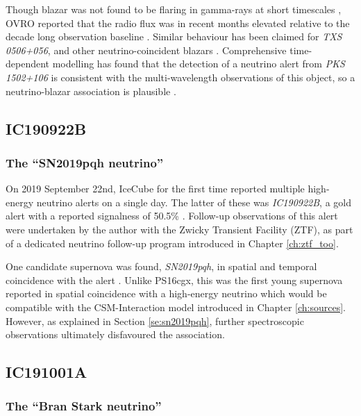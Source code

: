 Though blazar was not found to be flaring in gamma-rays at short timescales \cite{franckowiak_20}, OVRO reported that the radio flux was in recent months elevated relative to the decade long observation baseline . Similar behaviour has been claimed for \emph{TXS 0506+056}, and other neutrino-coincident blazars \cite{ovro_19}. Comprehensive time-dependent modelling has found that the detection of a neutrino alert from \emph{PKS 1502+106} is consistent with the multi-wavelength observations of this object, so a neutrino-blazar association is plausible .


\subsection{IC190922B }
\subsubsection*{The ``SN2019pqh neutrino''}

On 2019 September 22nd, IceCube for the first time reported multiple high-energy neutrino alerts on a single day. The latter of these was \emph{IC190922B}, a gold alert with a reported signalness of 50.5\% . Follow-up observations of this alert were undertaken by the author with the Zwicky Transient Facility (ZTF), as part of a dedicated neutrino follow-up program introduced in Chapter \ref{ch:ztf_too}. 

One candidate supernova was found, \emph{SN2019pqh}, in spatial and temporal coincidence with the alert . Unlike PS16cgx, this was the first young supernova reported in spatial coincidence with a high-energy neutrino which would be compatible with the CSM-Interaction model introduced in Chapter \ref{ch:sources}. However, as explained in Section \ref{se:sn2019pqh}, further spectroscopic observations ultimately disfavoured the association. 

\subsection{IC191001A} 
\subsubsection*{The ``Bran Stark neutrino''}

